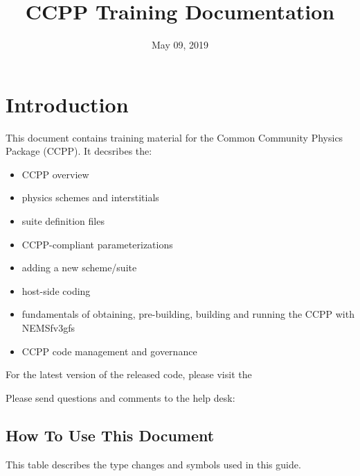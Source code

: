 \documentclass[letterpaper,10pt,english]{sphinxmanual}
\title{CCPP Training Documentation}
\date{May 09, 2019}
\author{ }
\begin{document}
\pagestyle{empty}
\sphinxmaketitle
\pagestyle{plain}
\sphinxtableofcontents
\pagestyle{normal}
\label{\detokenize{index::doc}}

\label{\detokenize{Introduction:introduction}}

\chapter{Introduction}
\label{\detokenize{Introduction:id1}}\label{\detokenize{Introduction::doc}}
This document contains training material for the Common Community Physics Package (CCPP). It decsribes the:
\begin{itemize}
\item {} 
CCPP overview

\item {} 
physics schemes and interstitials

\item {} 
suite definition files

\item {} 
CCPP-compliant parameterizations

\item {} 
adding a new scheme/suite

\item {} 
host-side coding

\item {} 
fundamentals of obtaining, pre-building, building and running the CCPP with NEMSfv3gfs

\item {} 
CCPP code management and governance

\end{itemize}

For the latest version of the released code, please visit the 

Please send questions and comments to the help desk: 


\section{How To Use This Document}
\label{\detokenize{Introduction:how-to-use-this-document}}
This table describes the type changes and symbols used in this guide.
\end{document}
